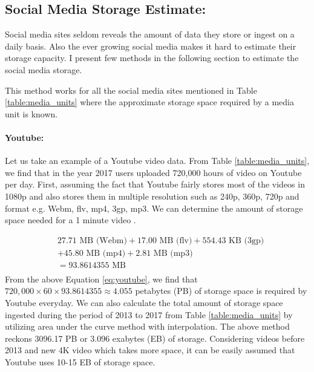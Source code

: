 \subsection*{Social Media Storage Estimate:}
Social media sites seldom reveals the amount of data they store or ingest on a daily basis. Also the ever growing social media makes it hard to estimate their storage capacity. I present few methods in the following section to estimate the social media storage.

This method works for all the social media sites mentioned in Table \ref{table:media_units} where the approximate storage space required by a media unit is known.

\paragraph{Youtube:}
Let us take an example of a Youtube video data. From Table  \ref{table:media_units}, we find that in the year 2017 users uploaded 720,000 hours of video on Youtube per day. First, assuming the fact that Youtube fairly stores most of the videos
 in 1080p and also stores them in multiple resolution such as 240p, 360p, 720p and format e.g. Webm, flv, mp4, 3gp, mp3. We can determine the amount of storage space needed for a 1 minute video \cite{youtube_stats}.

\begin{equation}
\begin{split}
  &27.71 \text{ MB (Webm)} + 17.00 \text{ MB (flv)} + 554.43 \text{ KB (3gp)} \\
  &+ 45.80 \text{ MB (mp4)} + 2.81 \text{ MB (mp3)}\\
  &= 93.8614355 \text{ MB}\\
  \end{split}
  \label{eq:youtube}
\end{equation}
 From the above Equation \ref{eq:youtube}, we find that $720,000 \times 60 \times 93.8614355 \approx 4.055$ petabytes (PB)  of storage space is required by Youtube everyday. We can also calculate the total amount of storage space ingested during the period of 2013 to 2017 from Table \ref{table:media_units} by utilizing area under the curve method with interpolation. The above method reckons 3096.17 PB or 3.096 exabytes (EB) of storage. Considering videos before 2013 and new 4K video which takes more space, it can be easily assumed that Youtube uses 10-15 EB of storage space.

